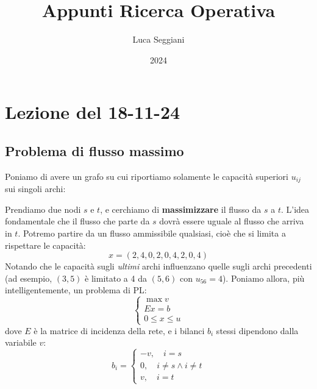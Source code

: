 \documentclass[a4paper,11pt]{article}
\title{Appunti Ricerca Operativa}
\author{Luca Seggiani}
\date{2024}
\begin{document}
\section{Lezione del 18-11-24}

\thispagestyle{empty}
\pagestyle{fancy}

\subsection{Problema di flusso massimo}
Poniamo di avere un grafo su cui riportiamo solamente le capacità superiori $u_{ij}$ sui singoli archi: 

\begin{center}
\end{center}

Prendiamo due nodi $s$ e $t$, e cerchiamo di \textbf{massimizzare} il flusso da $s$ a $t$.
L'idea fondamentale che il flusso che parte da $s$ dovrà essere uguale al flusso che arriva in $t$.
Potremo partire da un flusso ammissibile qualsiasi, cioè che si limita a rispettare le capacità:
$$
x = \left( 2, 4, 0, 2, 0, 4, 2, 0, 4 \right)
$$
Notando che le capacità sugli \textit{ultimi} archi influenzano quelle sugli archi precedenti (ad esempio, $(3,5)$ è limitato a 4 da $(5,6)$ con $u_{56} = 4$).
Poniamo allora, più intelligentemente, un problema di PL:
\[
	\begin{cases}
		\max v \\ 
		Ex = b \\ 
		0 \leq x \leq u
	\end{cases}
\]
dove $E$ è la matrice di incidenza della rete, e i bilanci $b_i$ stessi dipendono dalla variabile $v$: 
\[
	b_i = 
	\begin{cases}
		-v, \quad i = s \\ 
		0, \quad i \neq s \wedge i \neq t \\ 
		v, \quad i = t
	\end{cases}
\]
\end{document}
